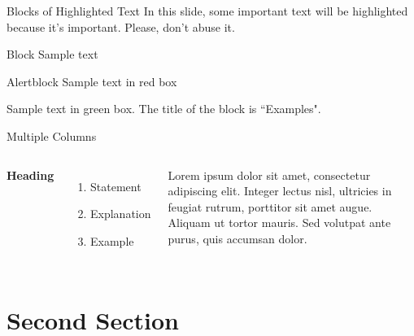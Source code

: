 \documentclass[aspectratio=169,xcolor=dvipsnames]{beamer}
\begin{document}

\iffalse
\begin{frame}{Blocks of Highlighted Text}
    In this slide, some important text will be \alert{highlighted} because it's important. Please, don't abuse it.

    \begin{block}{Block}
        Sample text
    \end{block}

    \begin{alertblock}{Alertblock}
        Sample text in red box
    \end{alertblock}

    \begin{examples}
        Sample text in green box. The title of the block is ``Examples".
    \end{examples}
\end{frame}


\begin{frame}{Multiple Columns}
    \begin{columns}[c] %

        \textbf{Heading}
        \begin{enumerate}
            \item Statement
            \item Explanation
            \item Example
        \end{enumerate}

        Lorem ipsum dolor sit amet, consectetur adipiscing elit. Integer lectus nisl, ultricies in feugiat rutrum, porttitor sit amet augue. Aliquam ut tortor mauris. Sed volutpat ante purus, quis accumsan dolor.

    \end{columns}
\end{frame}

\section{Second Section}
\end{document}
